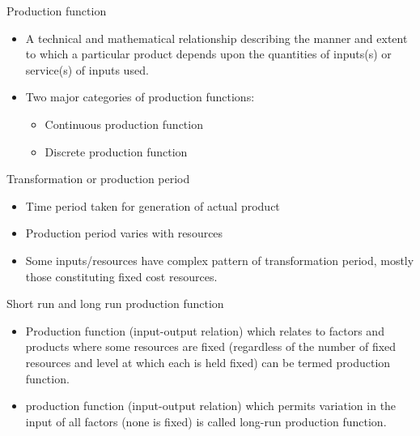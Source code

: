 \documentclass[12pt,ignorenonframetext,aspectratio=169]{beamer}
\providecommand{\tightlist}{%
  \setlength{\itemsep}{0pt}\setlength{\parskip}{0pt}}
\begin{document}
\begin{frame}{}
\protect\hypertarget{section-6}{}
\begin{block}{Production function}
\protect\hypertarget{production-function}{}
\begin{itemize}
\tightlist
\item
  A technical and mathematical relationship describing the manner and
  extent to which a particular product depends upon the quantities of
  inputs(s) or service(s) of inputs used.
\item
  Two major categories of production functions:

  \begin{itemize}
  \tightlist
  \item
    Continuous production function
  \item
    Discrete production function
  \end{itemize}
\end{itemize}
\end{block}

\begin{block}{Transformation or production period}
\protect\hypertarget{transformation-or-production-period}{}
\begin{itemize}
\tightlist
\item
  Time period taken for generation of actual product
\item
  Production period varies with resources
\item
  Some inputs/resources have complex pattern of transformation period,
  mostly those constituting fixed cost resources.
\end{itemize}
\end{block}
\end{frame}

\begin{frame}{}
\protect\hypertarget{section-7}{}
\begin{block}{Short run and long run production function}
\protect\hypertarget{short-run-and-long-run-production-function}{}
\begin{itemize}
\tightlist
\item
  Production function (input-output relation) which relates to factors
  and products where some resources are fixed (regardless of the number
  of fixed resources and level at which each is held fixed) can be
  termed  production function.
\item
  production function (input-output relation) which permits variation in
  the input of all factors (none is fixed) is called \alert{long-run}
  production function.
\end{itemize}
\end{block}
\end{frame}
\end{document}
